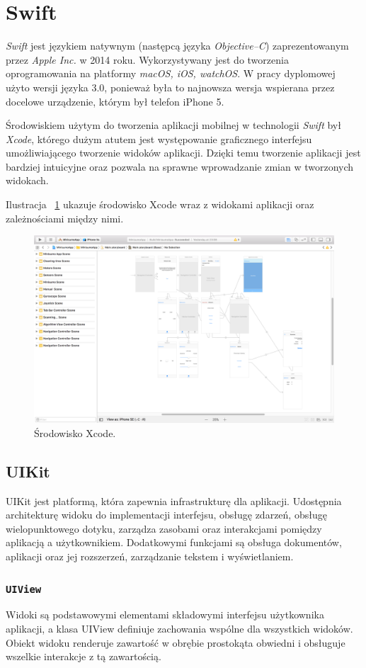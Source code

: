 \section{Swift}
\textit{Swift} jest językiem natywnym (następcą języka \textit{Objective–C}) zaprezentowanym przez \textit{Apple Inc.} w 2014 roku. Wykorzystywany jest do tworzenia oprogramowania na platformy \textit{macOS, iOS, watchOS}. W pracy dyplomowej użyto wersji języka 3.0, ponieważ była to najnowsza wersja wspierana przez docelowe urządzenie, którym był telefon iPhone 5.

Środowiskiem użytym do tworzenia aplikacji mobilnej w technologii \textit{Swift} był \textit{Xcode}, którego dużym atutem jest występowanie graficznego interfejsu umożliwiającego tworzenie widoków aplikacji. Dzięki temu tworzenie aplikacji jest bardziej intuicyjne oraz pozwala na sprawne wprowadzanie zmian w tworzonych widokach.

Ilustracja ~\ref{fig:xcode} ukazuje środowisko Xcode wraz z widokami aplikacji oraz zależnościami między nimi.   

\begin{figure}[H]
	\centering
		\includegraphics[width=0.75\linewidth]{pic02/xcode}
	\caption{Środowisko Xcode.}
	\label{fig:xcode}	
\end{figure}

\subsection{UIKit}
UIKit jest platformą, która zapewnia infrastrukturę dla aplikacji. Udostępnia  architekturę widoku do implementacji interfejsu, obsługę zdarzeń, obsługę wielopunktowego dotyku, zarządza zasobami oraz interakcjami pomiędzy aplikacją a użytkownikiem. Dodatkowymi funkcjami są obsługa dokumentów, aplikacji oraz jej rozszerzeń, zarządzanie tekstem i wyświetlaniem.

 \subsubsection{\lstinline$UIView$}
Widoki są podstawowymi elementami składowymi interfejsu użytkownika aplikacji, a klasa UIView definiuje zachowania wspólne dla wszystkich widoków. Obiekt widoku renderuje zawartość w obrębie prostokąta obwiedni i obsługuje wszelkie interakcje z tą zawartością. 

